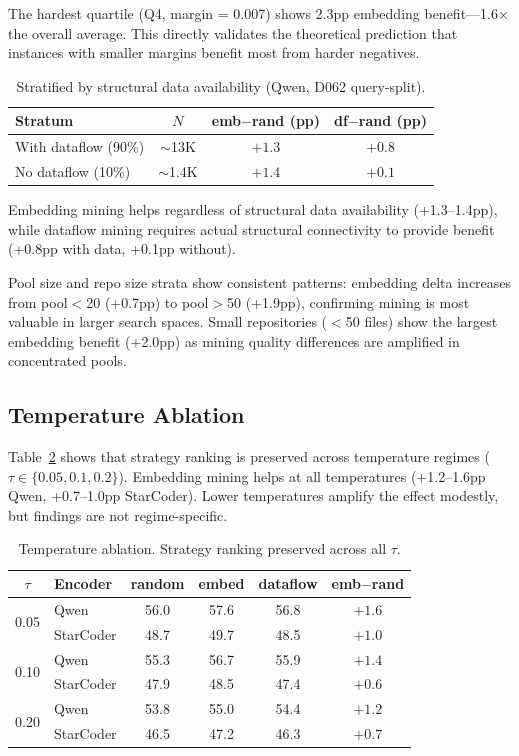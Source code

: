 \documentclass[11pt,a4paper]{article}
\begin{document}
The hardest quartile (Q4, margin = 0.007) shows 2.3pp embedding benefit---1.6$\times$ the overall average. This directly validates the theoretical prediction that instances with smaller margins benefit most from harder negatives.

\begin{table}[t]
\centering
\small
\caption{Stratified by structural data availability (Qwen, D062 query-split).}
\label{tab:stratified_struct}
\begin{tabular}{lccc}
\toprule
Stratum & $N$ & emb$-$rand (pp) & df$-$rand (pp) \\
\midrule
With dataflow (90\%) & $\sim$13K & $+1.3$ & $+0.8$ \\
No dataflow (10\%) & $\sim$1.4K & $+1.4$ & $+0.1$ \\
\bottomrule
\end{tabular}
\end{table}

Embedding mining helps regardless of structural data availability (+1.3--1.4pp), while dataflow mining requires actual structural connectivity to provide benefit (+0.8pp with data, +0.1pp without).

Pool size and repo size strata show consistent patterns: embedding delta increases from pool$<$20 (+0.7pp) to pool$>$50 (+1.9pp), confirming mining is most valuable in larger search spaces. Small repositories ($<$50 files) show the largest embedding benefit (+2.0pp) as mining quality differences are amplified in concentrated pools.

\subsection{Temperature Ablation}
\label{sec:temperature}

Table~\ref{tab:temperature} shows that strategy ranking is preserved across temperature regimes ($\tau \in \{0.05, 0.1, 0.2\}$). Embedding mining helps at all temperatures (+1.2--1.6pp Qwen, +0.7--1.0pp StarCoder). Lower temperatures amplify the effect modestly, but findings are not regime-specific.

\begin{table}[t]
\centering
\small
\caption{Temperature ablation. Strategy ranking preserved across all $\tau$.}
\label{tab:temperature}
\begin{tabular}{clcccc}
\toprule
$\tau$ & Encoder & random & embed & dataflow & emb$-$rand \\
\midrule
\multirow{2}{*}{0.05} & Qwen & 56.0 & 57.6 & 56.8 & $+1.6$ \\
& StarCoder & 48.7 & 49.7 & 48.5 & $+1.0$ \\
\midrule
\multirow{2}{*}{0.10} & Qwen & 55.3 & 56.7 & 55.9 & $+1.4$ \\
& StarCoder & 47.9 & 48.5 & 47.4 & $+0.6$ \\
\midrule
\multirow{2}{*}{0.20} & Qwen & 53.8 & 55.0 & 54.4 & $+1.2$ \\
& StarCoder & 46.5 & 47.2 & 46.3 & $+0.7$ \\
\bottomrule
\end{tabular}
\end{table}
\end{document}
